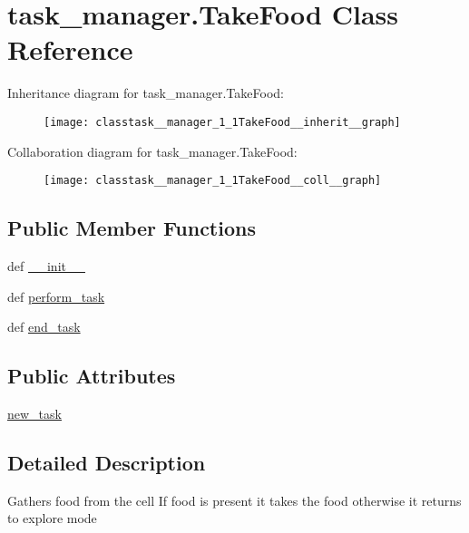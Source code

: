 \hypertarget{classtask__manager_1_1TakeFood}{\section{task\+\_\+manager.\+Take\+Food Class Reference}
\label{classtask__manager_1_1TakeFood}
}


Inheritance diagram for task\+\_\+manager.\+Take\+Food\+:\nopagebreak
\begin{figure}[H]
\begin{center}
\leavevmode
\texttt{[image: classtask\_\_manager\_1\_1TakeFood\_\_inherit\_\_graph]}
\end{center}
\end{figure}


Collaboration diagram for task\+\_\+manager.\+Take\+Food\+:\nopagebreak
\begin{figure}[H]
\begin{center}
\leavevmode
\texttt{[image: classtask\_\_manager\_1\_1TakeFood\_\_coll\_\_graph]}
\end{center}
\end{figure}
\subsection*{Public Member Functions}
\begin{DoxyCompactItemize}
\item 
def \hyperlink{classtask__manager_1_1TakeFood_a4c5cc2bb37fc196bc5cb34f56fa62a29}{\+\_\+\+\_\+init\+\_\+\+\_\+}
\item 
def \hyperlink{classtask__manager_1_1TakeFood_af42eebb5d9ee945cafd05908d478bab3}{perform\+\_\+task}
\item 
def \hyperlink{classtask__manager_1_1TakeFood_a01c78eece0496ccd7c7badde7ce848b4}{end\+\_\+task}
\end{DoxyCompactItemize}
\subsection*{Public Attributes}
\begin{DoxyCompactItemize}
\item 
\hyperlink{classtask__manager_1_1TakeFood_a592252f7a2b882cf283c9da9cbab07a2}{new\+\_\+task}
\end{DoxyCompactItemize}


\subsection{Detailed Description}
\begin{DoxyVerb}Gathers food from the cell
If food is present it takes the food otherwise it returns to explore mode
\end{DoxyVerb}
 

